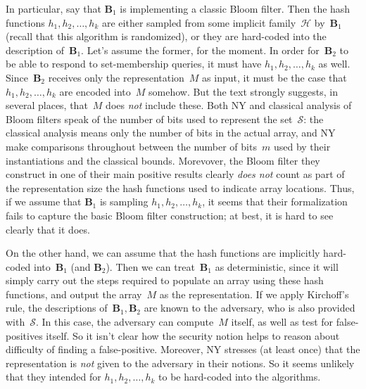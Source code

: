 In particular, say that $\mathbf{B}_1$ is implementing a classic Bloom filter.  Then the hash functions $h_1,h_2,\ldots,h_k$ are either sampled from some implicit family~$\mathcal{H}$ by~$\mathbf{B}_1$ (recall that this algorithm is randomized), or they are hard-coded into the description of~$\mathbf{B}_1$.  Let's assume the former, for the moment.  In order for~$\mathbf{B}_2$ to be able to respond to set-membership queries, it must have $h_1,h_2,\ldots,h_k$ as well.  Since~$\mathbf{B}_2$ receives only the representation~$M$ as input, it must be the case that $h_1,h_2,\ldots,h_k$ are encoded into~$M$ somehow.  But the text strongly suggests, in several places, that~$M$ does \emph{not} include these.  Both NY and classical analysis of Bloom filters speak of the number of bits used to represent the set~$\mathcal{S}$: the classical analysis means only the number of bits in the actual array, and NY make comparisons throughout between the number of bits~$m$ used by their instantiations and the classical bounds.  Morevover, the Bloom filter they construct in one of their main positive results clearly \emph{does not} count as part of the representation size the hash functions used to indicate array locations. Thus, if we assume that $\mathbf{B}_1$ is sampling $h_1,h_2,\ldots,h_k$, it seems that their formalization fails to capture the basic Bloom filter construction; at best, it is hard to see clearly that it does.

On the other hand, we can assume that the hash functions are implicitly hard-coded into~$\mathbf{B}_1$ (and $\mathbf{B}_2$).  Then we can treat~$\mathbf{B}_1$ as deterministic, since it will simply carry out the steps required to populate an array using these hash functions, and output the array~$M$ as the representation.  If we apply Kirchoff's rule, the descriptions of~$\mathbf{B}_1,\mathbf{B}_2$ are known to the adversary, who is also provided with~$\mathcal{S}$.  In this case, the adversary can compute~$M$ itself, as well as test for false-positives itself.  So it isn't clear how the security notion helps to reason about difficulty of finding a false-positive.  Moreover, NY stresses (at least once) that the representation is \emph{not} given to the adversary in their notions.  So it seems unlikely that they intended for $h_1,h_2,\ldots,h_k$ to be hard-coded into the algorithms.

